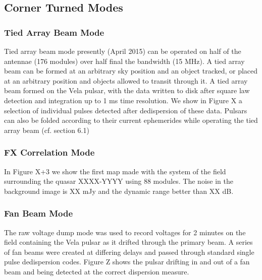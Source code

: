 \subsection{Corner Turned Modes}
\subsubsection{Tied Array Beam Mode}

Tied array beam mode presently (April 2015) can be operated on half of the antennae (176 modules) over half final the bandwidth (15 MHz). A tied array beam can be formed at an arbitrary sky position and an object tracked, or placed at an arbitrary position and objects allowed to transit through it. A tied array beam formed on the Vela pulsar, with the data written to disk after square law detection and integration up to 1 ms time resolution. We show in Figure X a selection of individual pulses detected after dedispersion of these data. Pulsars can also be folded according to their current ephemerides while operating the tied array beam (cf. section 6.1) 

\subsubsection{FX Correlation Mode}

In Figure X+3 we show the first map made with the system of the field surrounding the quasar XXXX-YYYY using 88 modules. The noise in the background image is XX mJy and the dynamic range better than XX dB.

\subsubsection{Fan Beam Mode}

The raw voltage dump mode was used to record voltages for 2 minutes on the field containing the Vela pulsar as it drifted through the primary beam. A series of fan beams were created at differing delays and passed through standard single pulse dedispersion codes. Figure Z shows the pulsar drifting in and out of a fan beam and being detected at the correct dispersion measure.

